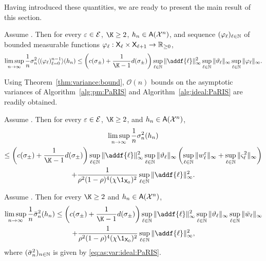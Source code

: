 Having introduced these quantities, we are ready to present the main result of this section. 

\begin{theorem} \label{thm:variance:bound}
Assume . 
Then for every $\varepsilon \in \mathcal{E}$, $\K \geq 2$, $h_n \in \mathsf{A}(\mathcal{X}^n)$, and sequence $(\varphi_\ell)_{\ell \in \mathbb{N}}$ of bounded measurable functions $\varphi_\ell : \mathsf{X}_\ell \times \mathsf{X}_{\ell + 1} \to \mathbb{R}_{\geq 0}$, 
$$
\limsup_{n \to \infty} \frac{1}{n} \sigma^2_n \langle (\varphi_\ell)_{\ell = 0}^{n - 1} \rangle (h_n) 
\leq \left( \cbound + \frac{1}{\K - 1} \dbound \right) 
\sup_{\ell \in \nset} \| \addf{\ell} \|_\infty^2 \sup_{\ell \in \nset} \| \adjfuncforward{\ell} \|_\infty \sup_{\ell \in \nset} \| \varphi_\ell \|_\infty.  
$$
\end{theorem}

Using Theorem~\ref{thm:variance:bound}, $\mathcal{O}(n)$ bounds on the asymptotic variances of Algorithm~\ref{alg:pm:PaRIS} and Algorithm~\ref{alg:ideal:PaRIS} are readily obtained. 

\begin{corollary} \label{cor:variance:bound}
Assume . Then for every $\varepsilon \in \mathcal{E}$, $\K \geq 2$, and $h_n \in \mathsf{A}(\mathcal{X}^n)$, 
\begin{multline} \label{eq:variance:bound:full:monty}
\limsup_{n \to \infty} \frac{1}{n} \sigma^2_n(h_n) \\ 
\leq \left( \cbound + \frac{1}{\K - 1} \dbound \right) \sup_{\ell \in \nset} \| \addf{\ell} \|_\infty^2 \sup_{\ell \in \nset} \| \adjfuncforward{\ell} \|_\infty  \left( \sup_{\ell \in \nset} \| \wgtfuncmod{\ell} \|_\infty + \sup_{\ell \in \nset} \| \ukestvar{\ell} \|_\infty \right) \\
+ \frac{1}{\rho^2(1 - \rho)^4 (\chi \1_{\Xset_0})^2} \sup_{\ell \in \nset} \| \addf{\ell} \|_\infty^2. 
\end{multline}
\end{corollary}

\begin{corollary} \label{cor:variance:bound:ideal:PaRIS}
Assume . Then for every $\K \geq 2$ and $h_n \in \mathsf{A}(\mathcal{X}^n)$, 
\begin{multline*}
\limsup_{n \to \infty} \frac{1}{n} \bar{\sigma}^2_n(h_n) \leq  \left( \cbound + \frac{1}{\K - 1} \dbound \right)
\sup_{\ell \in \nset} \| \addf{\ell} \|_\infty^2 \sup_{\ell \in \nset} \| \adjfuncforward{\ell} \|_\infty \sup_{\ell \in \nset} \| \wgtfuncideal{\ell} \|_\infty \\
+ \frac{1}{\rho^2(1 - \rho)^4 (\chi \1_{\Xset_0})^2} \sup_{\ell \in \nset} \| \addf{\ell} \|_\infty^2,  
\end{multline*}
where $(\bar{\sigma}^2_n)_{n \in \mathbb{N}}$ is given by \eqref{eq:as:var:ideal:PaRIS}. 
\end{corollary}

